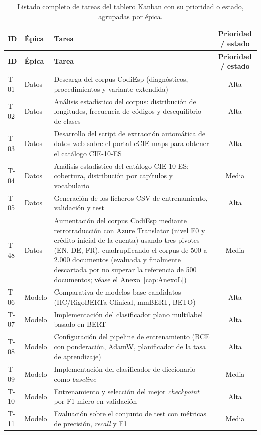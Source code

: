 \begin{center}
\footnotesize
\begin{longtable}{llP{7.5cm}c}
\caption{Listado completo de tareas del tablero Kanban con su prioridad o estado, agrupadas por épica.}\label{tab:kanban}\\
\hline
\textbf{ID} & \textbf{Épica} & \textbf{Tarea} & \textbf{Prioridad / estado} \\
\hline
\endfirsthead
\hline
\textbf{ID} & \textbf{Épica} & \textbf{Tarea} & \textbf{Prioridad / estado} \\
\hline
\endhead
\hline
\endfoot

T-01 & Datos & Descarga del corpus CodiEsp (diagnósticos, procedimientos y variante extendida) & Alta \\
T-02 & Datos & Análisis estadístico del corpus: distribución de longitudes, frecuencia de códigos y desequilibrio de clases & Alta \\
T-03 & Datos & Desarrollo del script de extracción automática de datos web sobre el portal eCIE-maps para obtener el catálogo CIE-10-ES & Alta \\
T-04 & Datos & Análisis estadístico del catálogo CIE-10-ES: cobertura, distribución por capítulos y vocabulario & Media \\
T-05 & Datos & Generación de los ficheros CSV de entrenamiento, validación y test & Alta \\
T-48 & Datos & Aumentación del corpus CodiEsp mediante retrotraducción con Azure Translator (nivel F0 y crédito inicial de la cuenta) usando tres pivotes (EN, DE, FR), cuadruplicando el corpus de 500 a 2.000 documentos (evaluada y finalmente descartada por no superar la referencia de 500 documentos; véase el Anexo~\ref{cap:AnexoL}) & Media \\
\hline
T-06 & Modelo & Comparativa de modelos base candidatos (IIC/RigoBERTa-Clinical, mmBERT, BETO) & Alta \\
T-07 & Modelo & Implementación del clasificador plano multilabel basado en BERT & Alta \\
T-08 & Modelo & Configuración del pipeline de entrenamiento (BCE con ponderación, AdamW, planificador de la tasa de aprendizaje) & Alta \\
T-09 & Modelo & Implementación del clasificador de diccionario como \emph{baseline} & Media \\
T-10 & Modelo & Entrenamiento y selección del mejor \emph{checkpoint} por F1-micro en validación & Alta \\
T-11 & Modelo & Evaluación sobre el conjunto de test con métricas de precisión, \emph{recall} y F1 & Media \\

\end{longtable}
\end{center}
